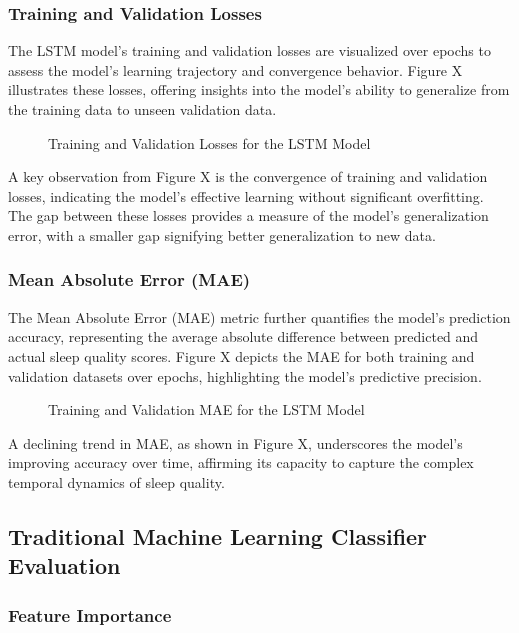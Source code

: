 \documentclass[10pt]{extarticle}
\begin{document}
\subsubsection{Training and Validation Losses}

The LSTM model's training and validation losses are visualized over epochs to assess the model's learning trajectory and convergence behavior. Figure X illustrates these losses, offering insights into the model's ability to generalize from the training data to unseen validation data.

\begin{figure}[H]
    \centering
    \caption{Training and Validation Losses for the LSTM Model}
\end{figure}

A key observation from Figure X is the convergence of training and validation losses, indicating the model's effective learning without significant overfitting. The gap between these losses provides a measure of the model's generalization error, with a smaller gap signifying better generalization to new data.

\subsubsection{Mean Absolute Error (MAE)}

The Mean Absolute Error (MAE) metric further quantifies the model's prediction accuracy, representing the average absolute difference between predicted and actual sleep quality scores. Figure X depicts the MAE for both training and validation datasets over epochs, highlighting the model's predictive precision.

\begin{figure}[H]
    \centering
    \caption{Training and Validation MAE for the LSTM Model}
\end{figure}

A declining trend in MAE, as shown in Figure X, underscores the model's improving accuracy over time, affirming its capacity to capture the complex temporal dynamics of sleep quality.

\subsection{Traditional Machine Learning Classifier Evaluation}

\subsubsection{Feature Importance}
\end{document}

